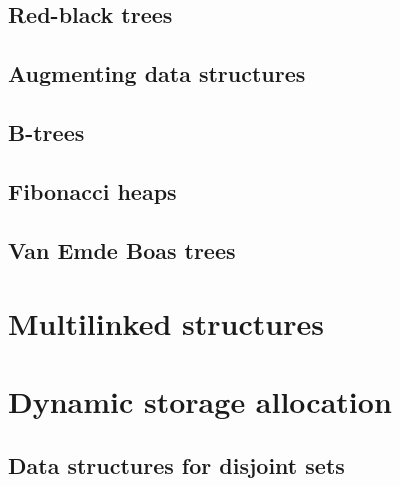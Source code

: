 \subsection{Red-black trees}
\subsection{Augmenting data structures}
\subsection{B-trees}
\subsection{Fibonacci heaps}
\subsection{Van Emde Boas trees}
\section{Multilinked structures}
\section{Dynamic storage allocation}
\subsection{Data structures for disjoint sets}